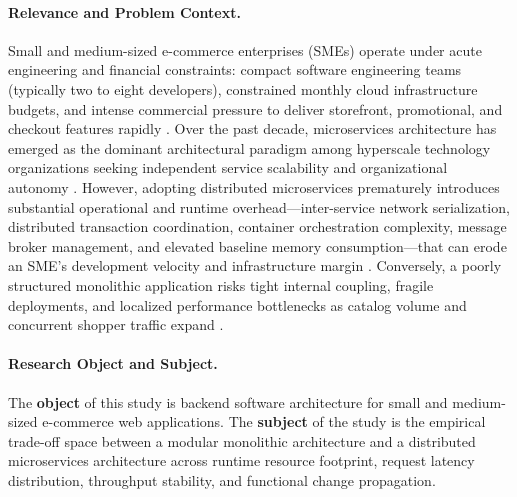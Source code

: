 
\paragraph{Relevance and Problem Context.}
Small and medium-sized e-commerce enterprises (SMEs) operate under acute engineering and financial constraints: compact software engineering teams (typically two to eight developers), constrained monthly cloud infrastructure budgets, and intense commercial pressure to deliver storefront, promotional, and checkout features rapidly \cite{newman2021,ford2022}. Over the past decade, microservices architecture has emerged as the dominant architectural paradigm among hyperscale technology organizations seeking independent service scalability and organizational autonomy \cite{fowler2014,dragoni2017}. However, adopting distributed microservices prematurely introduces substantial operational and runtime overhead—inter-service network serialization, distributed transaction coordination, container orchestration complexity, message broker management, and elevated baseline memory consumption—that can erode an SME's development velocity and infrastructure margin \cite{fowler2015monolith,soldani2018}. Conversely, a poorly structured monolithic application risks tight internal coupling, fragile deployments, and localized performance bottlenecks as catalog volume and concurrent shopper traffic expand \cite{parnas1972,richardson2018}.

\paragraph{Research Object and Subject.}
The \textbf{object} of this study is backend software architecture for small and medium-sized e-commerce web applications. The \textbf{subject} of the study is the empirical trade-off space between a modular monolithic architecture and a distributed microservices architecture across runtime resource footprint, request latency distribution, throughput stability, and functional change propagation.

